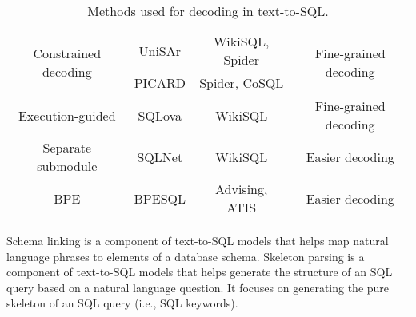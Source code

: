 \begin{table}
\begin{tabular}{|c|c|c|c|}
        \multirow{2}{*}{Constrained decoding}                      & UniSAr              & WikiSQL, Spider           & \multirow{2}{*}{Fine-grained decoding}                                                   \\
                                                                   & PICARD              & Spider, CoSQL
                                                                   &                                                                                                                                            \\
        \hline
        Execution-guided                                           & SQLova              & WikiSQL                   & Fine-grained decoding                                                                    \\
        \hline
        Separate submodule                                         & SQLNet              & WikiSQL                   & Easier decoding                                                                          \\
        \hline
        BPE                                                        & BPESQL              & Advising, ATIS
                                                                   & Easier decoding
        \\
        \hline
    \end{tabular}
    \caption{Methods used for decoding in text-to-SQL.}
    \label{tab:decoders}
\end{table}










Schema linking is a component of text-to-SQL models that helps map natural language phrases to elements of a database schema.
Skeleton parsing is a component of text-to-SQL models that helps generate the structure of an SQL query based on a natural language question. It focuses on generating the pure skeleton of an SQL query (i.e., SQL keywords).